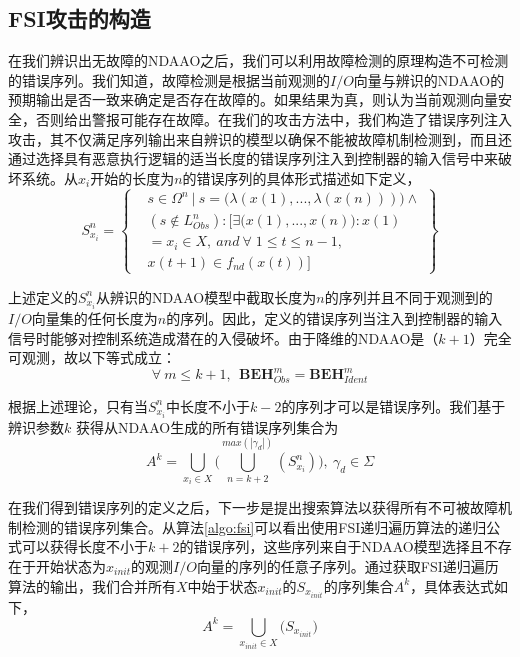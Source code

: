 \subsection{FSI攻击的构造}

在我们辨识出无故障的NDAAO之后，我们可以利用故障检测的原理构造不可检测的错误序列。我们知道，故障检测是根据当前观测的$I/O$向量与辨识的NDAAO的预期输出是否一致来确定是否存在故障的。如果结果为真，则认为当前观测向量安全，否则给出警报可能存在故障。在我们的攻击方法中，我们构造了错误序列注入攻击，其不仅满足序列输出来自辨识的模型以确保不能被故障机制检测到，而且还通过选择具有恶意执行逻辑的适当长度的错误序列注入到控制器的输入信号中来破坏系统。从$ x_i $开始的长度为$ n $的错误序列的具体形式描述如下定义，
\begin{equation} 
S_{x_i}^{n}=\left\{\begin{split} &s\in \Omega^n~|~s=\big( \lambda(x(1),...,\lambda(x(n))) \big)\wedge\\
&(s\notin L_{Obs}^n):[\exists \big(x(1),...,x(n)\big): x(1)\\&=x_i\in X,~and~
\forall\;1\leq t\leq n-1,\\&x(t+1)\in f_{nd}(x(t))] \end{split} \right\} 
\end{equation}

上述定义的$ S_{x_i}^{n} $从辨识的NDAAO模型中截取长度为$ n $的序列并且不同于观测到的$I/O$向量集的任何长度为$ n $的序列。因此，定义的错误序列当注入到控制器的输入信号时能够对控制系统造成潜在的入侵破坏。由于降维的NDAAO是$（k + 1）$完全可观测，故以下等式成立：
\begin{equation} 
\forall~m\leq k+1,~~\textbf{BEH}_{Obs}^m=\textbf{BEH}_{Ident}^m 
\end{equation}

根据上述理论，只有当$ S_ {x_i} ^ {n} $中长度不小于$ k-2 $的序列才可以是错误序列。我们基于辨识参数$ k $ 获得从NDAAO生成的所有错误序列集合为
\begin{equation} 
A^k=\bigcup_{x_i\in X} \big( \bigcup_{n=k+2}^{max(|\gamma_d|)} (S_{x_i}^{n})\big),~\gamma_d\in \Sigma \end{equation}

在我们得到错误序列的定义之后，下一步是提出搜索算法以获得所有不可被故障机制检测的错误序列集合。从算法\ref{algo:fsi}可以看出使用FSI递归遍历算法的递归公式可以获得长度不小于$ k + 2 $的错误序列，这些序列来自于NDAAO模型选择且不存在于开始状态为$ x_ {init} $的观测$I/O$向量的序列的任意子序列。通过获取FSI递归遍历算法的输出，我们合并所有$ X $中始于状态$ x_ {init} $的$ S_ {x_ {init}} $的序列集合$ A ^ k $，具体表达式如下，
\begin{equation} 
A^k=\bigcup_{x_{init}\in X} \big(S_{x_{init}}\big) 
\end{equation}


